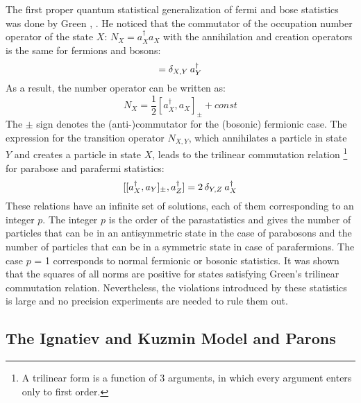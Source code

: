 The first proper quantum statistical generalization of fermi and bose statistics was done by Green \cite{Green1953}, \cite{Greenberg2000}. He noticed that the commutator of the occupation number operator of the state $X$: $N_{X} = a^{\dag}_{X} a_{X} $ with the annihilation and creation operators is the same for fermions and bosons:
\begin{equation}
 [N_{X},a^{\dag}_{Y}] = \delta_{X,Y} \hspace{0.2em} a^{\dag}_{Y}
\end{equation} 
As a result, the number operator can be written as:
\begin{equation}
 N_{X} = \frac{1}{2}[a^{\dag}_{X},a_{X}]_{\pm} + const
\end{equation} 
The $\pm$ sign denotes the (anti-)commutator for the (bosonic) fermionic case. The expression for the transition operator $N_{X,Y}$, which annihilates a particle in state $Y$ and creates a particle in state $X$, leads to the trilinear commutation relation \footnote{A trilinear form is a function of 3 arguments, in which every argument enters only to first order.} for parabose and parafermi statistics:
\begin{equation}
\label{eq:triComm}
 [[a^{\dag}_{X},a_{Y}]_{\pm},a_{Z}^{\dag}] = 2 \hspace{0.2em} \delta_{Y,Z} \hspace{0.2em} a_{X}^{\dag}
\end{equation} 
These relations have an infinite set of solutions, each of them corresponding to an integer $p$. The integer $p$ is the order of the parastatistics and gives the number of particles that can be in an antisymmetric state in the case of parabosons and the number of particles that can be in a symmetric state in case of parafermions. The case $p$ = 1 corresponds to normal fermionic or bosonic statistics. It was shown that the squares of all norms are positive for states satisfying Green's trilinear commutation relation. Nevertheless, the violations introduced by these statistics is large and no precision experiments are needed to rule them out.

\subsection{The Ignatiev and Kuzmin Model and Parons}

